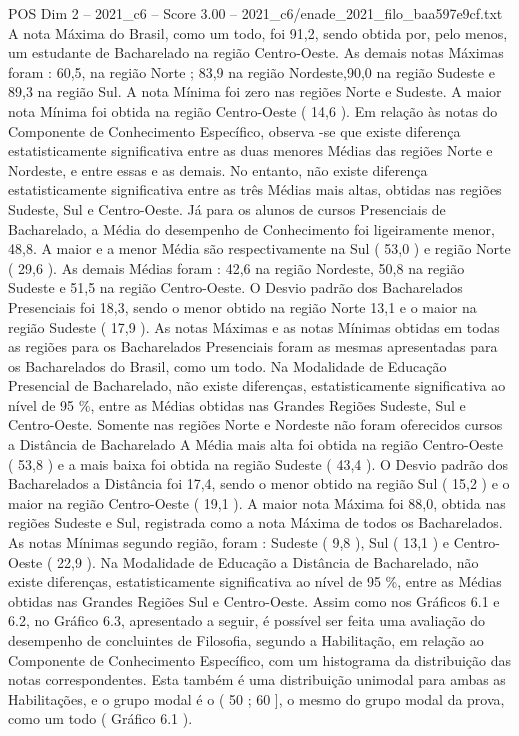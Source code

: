 \begin{textsample}{POS Dim 2 – 2021\_c6 – Score 3.00 – 2021\_c6/enade\_2021\_filo\_baa597e9cf.txt}
A nota Máxima do Brasil, como um todo, foi 91,2, sendo obtida por, pelo menos, um estudante de Bacharelado na região Centro-Oeste.
As demais notas Máximas foram : 60,5, na região Norte ; 83,9 na região Nordeste,90,0 na região Sudeste e 89,3 na região Sul.
A nota Mínima foi zero nas regiões Norte e Sudeste.
A maior nota Mínima foi obtida na região Centro-Oeste ( 14,6 ).
Em relação às notas do Componente de Conhecimento Específico, observa -se que existe diferença estatisticamente significativa entre as duas menores Médias das regiões Norte e Nordeste, e entre essas e as demais.
No entanto, não existe diferença estatisticamente significativa entre as três Médias mais altas, obtidas nas regiões Sudeste, Sul e Centro-Oeste.
Já para os alunos de cursos Presenciais de Bacharelado, a Média do desempenho de Conhecimento foi ligeiramente menor, 48,8.
A maior e a menor Média são respectivamente na Sul ( 53,0 ) e região Norte ( 29,6 ).
As demais Médias foram : 42,6 na região Nordeste, 50,8 na região Sudeste e 51,5 na região Centro-Oeste.
O Desvio padrão dos Bacharelados Presenciais foi 18,3, sendo o menor obtido na região Norte 13,1 e o maior na região Sudeste ( 17,9 ).
As notas Máximas e as notas Mínimas obtidas em todas as regiões para os Bacharelados Presenciais foram as mesmas apresentadas para os Bacharelados do Brasil, como um todo.
Na Modalidade de Educação Presencial de Bacharelado, não existe diferenças, estatisticamente significativa ao nível de 95 \%, entre as Médias obtidas nas Grandes Regiões Sudeste, Sul e Centro-Oeste.
Somente nas regiões Norte e Nordeste não foram oferecidos cursos a Distância de Bacharelado A Média mais alta foi obtida na região Centro-Oeste ( 53,8 ) e a mais baixa foi obtida na região Sudeste ( 43,4 ).
O Desvio padrão dos Bacharelados a Distância foi 17,4, sendo o menor obtido na região Sul ( 15,2 ) e o maior na região Centro-Oeste ( 19,1 ).
A maior nota Máxima foi 88,0, obtida nas regiões Sudeste e Sul, registrada como a nota Máxima de todos os Bacharelados.
As notas Mínimas segundo região, foram : Sudeste ( 9,8 ), Sul ( 13,1 ) e Centro-Oeste ( 22,9 ).
Na Modalidade de Educação a Distância de Bacharelado, não existe diferenças, estatisticamente significativa ao nível de 95 \%, entre as Médias obtidas nas Grandes Regiões Sul e Centro-Oeste.
Assim como nos Gráficos 6.1 e 6.2, no Gráfico 6.3, apresentado a seguir, é possível ser feita uma avaliação do desempenho de concluintes de Filosofia, segundo a Habilitação, em relação ao Componente de Conhecimento Específico, com um histograma da distribuição das notas correspondentes.
Esta também é uma distribuição unimodal para ambas as Habilitações, e o grupo modal é o ( 50 ; 60 ], o mesmo do grupo modal da prova, como um todo ( Gráfico 6.1 ).

\end{textsample}
